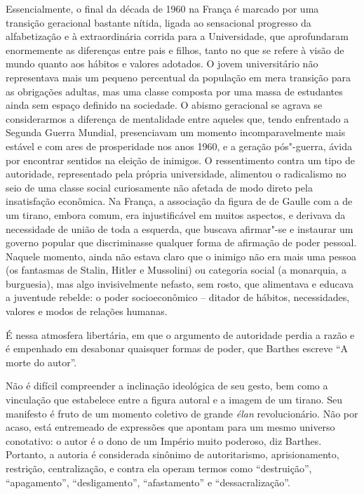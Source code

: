 Essencialmente, o final da década de 1960 na França é marcado por uma
transição geracional bastante nítida, ligada ao sensacional progresso da
alfabetização e à extraordinária corrida para a Universidade, que
aprofundaram enormemente as diferenças entre pais e filhos, tanto no que
se refere à visão de mundo quanto aos hábitos e valores adotados. O
jovem universitário não representava mais um pequeno percentual da
população em mera transição para as obrigações adultas, mas uma classe
composta por uma massa de estudantes ainda sem espaço definido na
sociedade. O abismo geracional se agrava se considerarmos a diferença de
mentalidade entre aqueles que, tendo enfrentado a Segunda Guerra
Mundial, presenciavam um momento incomparavelmente mais estável e com
ares de prosperidade nos anos 1960, e a geração pós"-guerra, ávida por
encontrar sentidos na eleição de inimigos. O ressentimento contra um
tipo de autoridade, representado pela própria universidade, alimentou o
radicalismo no seio de uma classe social curiosamente não afetada de
modo direto pela insatisfação econômica. Na França, a associação da
figura de de Gaulle com a de um tirano, embora comum, era injustificável
em muitos aspectos, e derivava da necessidade de união de toda a
esquerda, que buscava afirmar"-se e instaurar um governo popular que
discriminasse qualquer forma de afirmação de poder pessoal. Naquele
momento, ainda não estava claro que o inimigo não era mais uma pessoa
(os fantasmas de Stalin, Hitler e Mussolini) ou categoria social (a monarquia, a burguesia), mas algo invisivelmente nefasto, sem rosto, que
alimentava e educava a juventude rebelde: o poder socioeconômico --
ditador de hábitos, necessidades, valores e modos de relações humanas.

É nessa atmosfera libertária, em que o argumento de autoridade perdia a
razão e é empenhado em desabonar quaisquer formas de poder, que Barthes
escreve ``A morte do autor''.

Não é difícil compreender a inclinação ideológica de seu gesto, bem como
a vinculação que estabelece entre a figura autoral e a imagem de um
tirano. Seu manifesto é fruto de um momento coletivo de grande \emph{élan}
revolucionário. Não por acaso, está entremeado de expressões que apontam
para um mesmo universo conotativo: o autor é o dono de um Império muito
poderoso, diz Barthes. Portanto, a autoria é considerada sinônimo de
autoritarismo, aprisionamento, restrição, centralização, e contra ela
operam termos como ``destruição'', ``apagamento'', ``desligamento'',
``afastamento'' e ``dessacralização''.


